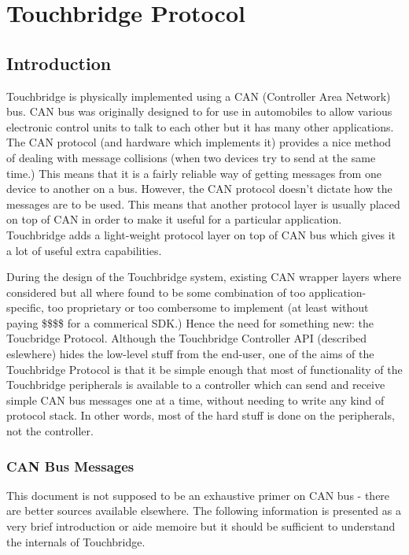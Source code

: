 \documentclass[12pt]{article}
\begin{document}
\section{Touchbridge Protocol}

\subsection{Introduction}

Touchbridge is physically implemented using a CAN (Controller Area Network)
bus. CAN bus was originally designed to for use in automobiles to allow various
electronic control units to talk to each other but it has many other
applications. The CAN protocol (and hardware which implements it) provides a
nice method of dealing with message collisions (when two devices try to send at
the same time.) This means that it is a fairly reliable way of getting messages
from one device to another on a bus. However, the CAN protocol doesn't dictate
how the messages are to be used. This means that another protocol layer is
usually placed on top of CAN in order to make it useful for a particular
application. Touchbridge adds a light-weight protocol layer on top of CAN bus
which gives it a lot of useful extra capabilities.

During the design of the Touchbridge system, existing CAN wrapper layers where
considered but all where found to be some combination of too
application-specific, too proprietary or too combersome to implement (at least
without paying \$\$\$\$ for a commerical SDK.) Hence the need for something
new: the Toucbridge Protocol. Although the Touchbridge Controller API
(described eslewhere) hides the low-level stuff from the end-user, one of the
aims of the Touchbridge Protocol is that it be simple enough that most of
functionality of the Touchbridge peripherals is available to a controller which
can send and receive simple CAN bus messages one at a time, without needing to
write any kind of protocol stack. In other words, most of the hard stuff is
done on the peripherals, not the controller.


\subsubsection{CAN Bus Messages}

This document is not supposed to be an exhaustive primer on CAN bus - there are
better sources available elsewhere. The following information is presented as a
very brief introduction or aide memoire but it should be sufficient to
understand the internals of Touchbridge. 
\end{document}
